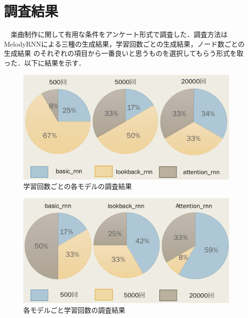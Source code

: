 \section{調査結果}
　楽曲制作に関して有用な条件をアンケート形式で調査した．調査方法はMelodyRNNによる三種の生成結果，学習回数ごとの生成結果，ノード数ごとの生成結果
のそれぞれの項目から一番良いと思うものを選択してもらう形式を取った．以下に結果を示す．
\begin{figure}[h]
    \begin{screen}
    \begin{center}
        \includegraphics[scale=0.5, clip]{./img/glaph1.png}
        \caption{学習回数ごとの各モデルの調査結果}
        \label{fig:学習回数ごと各モデルの調査結果}
    \end{center}
    \end{screen}
\end{figure}
\begin{figure}[h]
    \begin{screen}
    \begin{center}
        \includegraphics[scale=0.5, clip]{./img/glaph2.png}
        \caption{各モデルごと学習回数の調査結果}
        \label{fig:各モデルごとの学習回数の調査結果}
    \end{center}
    \end{screen}
\end{figure}
